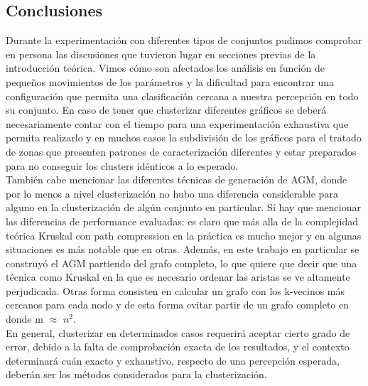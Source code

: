 \documentclass[11pt,a4paper]{article}
\begin{document}
\subsection{Conclusiones}
Durante la experimentación con diferentes tipos de conjuntos pudimos comprobar en persona las discusiones que tuvieron lugar en secciones previas de la introducción teórica. Vimos cómo son afectados los análisis en función de pequeños movimientos de los parámetros y la dificultad para encontrar una configuración que permita una clasificación cercana a nuestra percepción en todo su conjunto. En caso de tener que clusterizar diferentes gráficos se deberá necesariamente contar con el tiempo para una experimentación exhaustiva que permita realizarlo y en muchos casos la subdivisión de los gráficos para el tratado de zonas que presenten patrones de caracterización diferentes y estar preparados para no conseguir los clusters idénticos a lo esperado. 
\\ También cabe mencionar las diferentes técnicas de generación de AGM, donde por lo menos a nivel clusterización no hubo una diferencia considerable para alguno en la clusterización de algún conjunto en particular. Sí hay que mencionar las diferencias de performance evaluadas: es claro que más alla de la complejidad teórica Kruskal con path compression en la práctica es mucho mejor y en algunas situaciones es más notable que en otras. Además, en este trabajo en particular se construyó el AGM partiendo del grafo completo, lo que quiere que decir que una técnica como Kruskal en la que es necesario ordenar las aristas se ve altamente perjudicada. Otras forma consisten en calcular un grafo con los k-vecinos más  cercanos para cada nodo y de esta forma evitar partir de un grafo completo en donde m $\approx$ $n^{2}$.\\ En general, clusterizar en determinados casos requerirá aceptar cierto grado de error, debido a la falta de comprobación exacta de los resultados, y el contexto determinará cuán exacto y exhaustivo, respecto de una percepción esperada, deberán ser los métodos considerados para la clusterización.


\pagebreak

\end{document}
